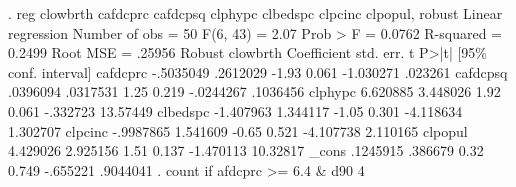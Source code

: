 . reg clowbrth cafdcprc cafdcpsq clphypc clbedspc clpcinc clpopul, robust
{\smallskip}
Linear regression                               Number of obs     =         50
                                                F(6, 43)          =       2.07
                                                Prob > F          =     0.0762
                                                R-squared         =     0.2499
                                                Root MSE          =     .25956
{\smallskip}
             {\VBAR}               Robust
    clowbrth {\VBAR} Coefficient  std. err.      t    P>|t|     [95\% conf. interval]
    cafdcprc {\VBAR}  -.5035049   .2612029    -1.93   0.061    -1.030271     .023261
    cafdcpsq {\VBAR}   .0396094   .0317531     1.25   0.219    -.0244267    .1036456
     clphypc {\VBAR}   6.620885   3.448026     1.92   0.061     -.332723    13.57449
    clbedspc {\VBAR}  -1.407963   1.344117    -1.05   0.301    -4.118634    1.302707
     clpcinc {\VBAR}  -.9987865   1.541609    -0.65   0.521    -4.107738    2.110165
     clpopul {\VBAR}   4.429026   2.925156     1.51   0.137    -1.470113    10.32817
       _cons {\VBAR}   .1245915    .386679     0.32   0.749     -.655221    .9044041
{\smallskip}
. count if afdcprc >= 6.4 \& d90
  4
{\smallskip}
